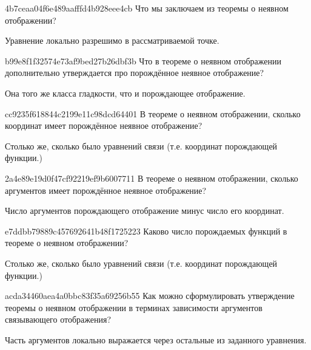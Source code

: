 \begin{note}{4b7ceaa04f6e489aafffd4b928eee4cb}
    Что мы заключаем из теоремы о неявном отображении?

    \begin{cloze}{1}
        Уравнение локально разрешимо в рассматриваемой точке.
    \end{cloze}
\end{note}

\begin{note}{b99e8f1f32574e73af9bed27b26dbf3b}
    Что в теореме о неявном отображении дополнительно утверждается про порождённое неявное отображение?

    \begin{cloze}{1}
        Она того же класса гладкости, что и порождающее отображение.
   \end{cloze}
\end{note}

\begin{note}{cc9235f618844c2199e11c98dcd64401}
    В теореме о неявном отображении, сколько координат имеет порождённое неявное отображение?

    \begin{cloze}{1}
        Столько же, сколько было уравнений связи (т.е. координат порождающей функции.)
    \end{cloze}
\end{note}

\begin{note}{2a4e89e19d0f47cf92219ef9b6007711}
    В теореме о неявном отображении, сколько аргументов имеет порождённое неявное отображение?

    \begin{cloze}{1}
        Число аргументов порождающего отображение минус число его координат.
   \end{cloze}
\end{note}

\begin{note}{e7ddbb79889c457692641b48f1725223}
    Каково число порождаемых функций в теореме о неявном отображении?

    \begin{cloze}{1}
        Столько же, сколько было уравнений связи (т.е. координат порождающей функции.)
    \end{cloze}
\end{note}

\begin{note}{acda34460aea4a0bbc83f35a69256b55}
    Как можно сформулировать утверждение теоремы о неявном отображении в терминах зависимости аргументов связывающего отображения?

    \begin{cloze}{1}
        Часть аргументов локально выражается через остальные из заданного уравнения.
    \end{cloze}
\end{note}

